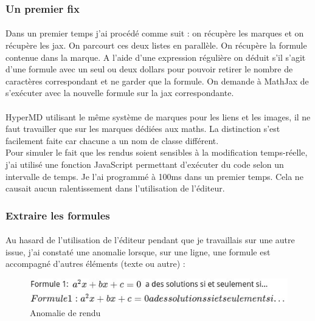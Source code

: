 \documentclass[12pt]{article}
\begin{document}
\subsubsection{Un premier fix}
\paragraph{}
Dans un premier temps j'ai procédé comme suit : on récupère les marques et on récupère les jax. On parcourt ces deux listes en parallèle. On récupère la formule contenue dans la marque. A l'aide d'une expression régulière on déduit s'il s'agit d'une formule avec un seul ou deux dollars pour pouvoir retirer le nombre de caractères correspondant et ne garder que la formule. On demande à MathJax de s'exécuter avec la nouvelle formule sur la jax correspondante.
\paragraph{}
HyperMD utilisant le même système de marques pour les liens et les images, il ne faut travailler que sur les marques dédiées aux maths. La distinction s'est facilement faite car chacune a un nom de classe différent.\\
Pour simuler le fait que les rendus soient sensibles à la modification temps-réelle, j'ai utilisé une fonction JavaScript permettant d'exécuter du code selon un intervalle de temps. Je l'ai programmé à 100ms dans un premier temps. Cela ne causait aucun ralentissement dans l'utilisation de l'éditeur.\\

\subsubsection{Extraire les formules}
\paragraph{}
Au hasard de l'utilisation de l'éditeur pendant que je travaillais sur une autre issue, j'ai constaté une anomalie lorsque, sur une ligne, une formule est accompagné d'autres éléments (texte ou autre) :

\begin{figure}[H]
    \centering
    \includegraphics[scale=0.9]{gallery/whole_line.jpg}
    \caption[nom dans le sommaire]{Anomalie de rendu}
    \label{fig:gallery6}
\end{figure}
\end{document}
